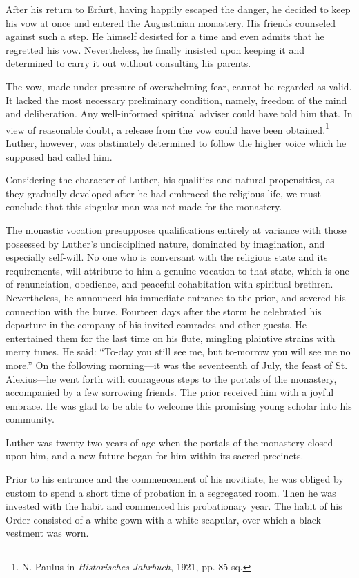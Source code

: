 After his return to Erfurt, having happily escaped the danger,
he decided to keep his vow at once and entered the Augustinian
monastery. His friends counseled against such a step. He himself
desisted for a time and even admits that he regretted his vow. Nevertheless, he finally insisted upon keeping it and determined to carry it
out without consulting his parents.

The vow, made under pressure of overwhelming fear, cannot be
regarded as valid. It lacked the most necessary preliminary condition,
namely, freedom of the mind and deliberation. Any well-informed
spiritual adviser could have told him that. In view of reasonable doubt,
a release from the vow could have been obtained.\footnote
{N. Paulus in \textit{Historisches Jahrbuch}, 1921, pp. 85 sq.}
Luther, however, was obstinately determined to follow the higher voice which he supposed had called him.

Considering the character of Luther, his qualities and natural
propensities, as they gradually developed after he had embraced the
religious life, we must conclude that this singular man was not made
for the monastery.

The monastic vocation presupposes qualifications entirely at variance with
those possessed by Luther’s undisciplined nature, dominated
by imagination, and especially self-will. No one who is conversant
with the religious state and its requirements, will attribute to him
a genuine vocation to that state, which is one of renunciation,
obedience, and peaceful cohabitation with spiritual brethren.
Nevertheless, he announced his immediate entrance to the prior, and
severed his connection with the burse. Fourteen days after the storm
he celebrated his departure in the company of his invited comrades
and other guests. He entertained them for the last time on his flute,
mingling plaintive strains with merry tunes. He said: “To-day you
still see me, but to-morrow you will see me no more.” On the following
morning—it was the seventeenth of July, the feast of St.
Alexius—he went forth with courageous steps to the portals of the
monastery, accompanied by a few sorrowing friends. The prior received
him with a joyful embrace. He was glad to be able to welcome
this promising young scholar into his community.

Luther was twenty-two years of age when the portals of the
monastery closed upon him, and a new future began for him within
its sacred precincts.

Prior to his entrance and the commencement of his novitiate, he
was obliged by custom to spend a short time of probation in a
segregated room. Then he was invested with the habit and commenced
his probationary year. The habit of his Order consisted of a white
gown with a white scapular, over which a black vestment was worn.

